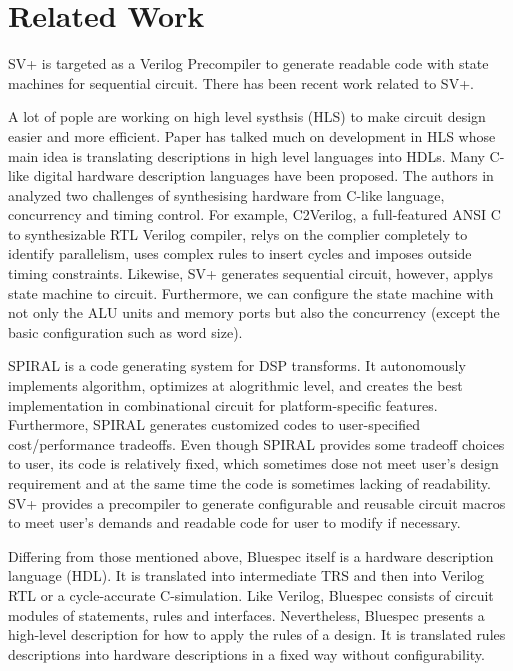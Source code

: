 \section{Related Work}\label{sec:relatedwork}
SV+ is targeted as a Verilog Precompiler to generate readable code with state machines for sequential circuit.
There has been recent work related to SV+.

A lot of pople are working on high level systhsis (HLS)\cite{HLS:intro} \cite{ChipDesign:HLS}\cite{SPARK} to make circuit design easier and more efficient. Paper\cite{Survey:HLS} has talked much on development in HLS whose main idea is translating descriptions in high level languages into HDLs.  
Many C-like digital hardware description languages have been proposed. The authors in\cite{HLSofDigitalSystems} analyzed two challenges of synthesising hardware from C-like language, concurrency and timing control. For example, C2Verilog\cite{C2Verilog}, a full-featured ANSI C to synthesizable RTL Verilog compiler, relys on the complier completely to identify parallelism, uses complex rules to insert cycles and imposes outside timing constraints. Likewise, SV+ generates sequential circuit, however, applys state machine to circuit. Furthermore, we can configure the state machine with not only the ALU units and memory ports but also the concurrency (except the basic configuration such as word size).

SPIRAL\cite{CodeG:Spiral}\cite{SpiralProject} is a code generating system for DSP transforms. It autonomously implements algorithm, optimizes at alogrithmic level, and creates the best implementation in combinational circuit for platform-specific features. Furthermore, SPIRAL generates customized codes to user-specified cost/performance tradeoffs. Even though SPIRAL provides some tradeoff choices to user, its code is relatively fixed, which sometimes dose not meet user's design requirement and at the same time the code is sometimes lacking of readability. SV+ provides a precompiler to generate configurable and reusable circuit macros to meet user's demands and readable code for user to modify if necessary.

Differing from those mentioned above, Bluespec itself is a hardware description language (HDL). It is translated into intermediate TRS and then into Verilog RTL or a cycle-accurate C-simulation. Like Verilog, Bluespec consists of circuit modules of statements, rules and interfaces. Nevertheless, Bluespec presents a high-level description for how to apply the rules of a design. It is translated rules descriptions into hardware descriptions in a fixed way without configurability.


